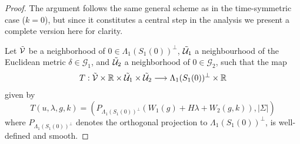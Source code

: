 \documentclass[10pt,a4paper]{amsart}
\begin{document}
\begin{proof}
The argument follows the same general scheme as in the time-symmetric case (\(k=0\)),
but since it constitutes a central step in the analysis we present a complete version here for clarity.

   Let $\Tilde{\mathcal{V}} $ be a neighborhood of $0 \in \Lambda_1(S_1(0))^\bot $,  $\Tilde{\mathcal{U}}_1 $ a neighbourhood of the Euclidean metric $\delta \in  \mathcal{G}_1$, and $\Tilde{\mathcal{U}}_2 $ a neighborhood of $0 \in  \mathcal{G}_2$, such that the map 
   \begin{equation}
       T: \Tilde{\mathcal{V}} \times \mathbb{R} \times \Tilde{\mathcal{U}}_1 \times \Tilde{\mathcal{U}}_2   \longrightarrow \Lambda_1(S_1(0))^\bot \times  \mathbb{R}
   \end{equation}
   given by 
   \begin{equation}
       T(u,\lambda, g, k)= \left( P_{\Lambda_1(S_1(0))^\bot}(W_1(g)+H \lambda +W_2(g,k)), |\Sigma|   \right)
   \end{equation}
where $P_{\Lambda_1(S_1(0))^\bot}$ denotes the orthogonal projection to $ \Lambda_1(S_1(0))^\bot$, is well-defined and smooth.
   

\end{proof}
\end{document}
